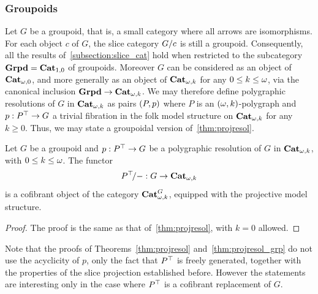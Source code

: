 \subsubsection{Groupoids}\label{ssubsec:resol_grp}
Let $G$ be a groupoid, that is, a small category where all arrows are
isomorphisms. For each
object $c$ of $G$, the slice category $G/c$ is still a groupoid. Consequently,
all the results of~\cref{subsection:slice_cat} hold when restricted to the
subcategory $\mathbf{Grpd}=\mathbf{Cat}_{1,0}$ of groupoids. Moreover $G$ can be
considered as an object of $\mathbf{Cat}_{\omega,0}$, and more generally as an object of $\mathbf{Cat}_{\omega,k}$ for any $0\leq k \leq \omega$, via the canonical inclusion $\mathbf{Grpd} \to \mathbf{Cat}_{\omega,k}$. We may therefore
define polygraphic resolutions of $G$ in $\mathbf{Cat}_{\omega,k}$ as pairs $(P,p)$ where $P$ is an $(\omega,k)$-polygraph and  $p:P^\top\to G$ a trivial fibration
in the folk model structure on $\mathbf{Cat}_{\omega,k}$ for any $k\geq 0$.  Thus, we may state a
groupoidal version of~\cref{thm:projresol}.
\begin{theorem}\label{thm:projresol_grp} Let $G$ be a groupoid and
$p:P^\top\to G$ be a polygraphic resolution of $G$ in $\mathbf{Cat}_{\omega,k}$, with
$0\leq k\leq \omega$. The functor
    \[P^\top\!/-:G\to \mathbf{Cat}_{\omega,k}\] is a cofibrant object of the
category $\mathbf{Cat}_{\omega,k}^{G}$, equipped with the projective model
structure.
\end{theorem}
\begin{proof} The proof is the same as that of~\cref{thm:projresol},
  with $k=0$ allowed.
\end{proof}
\begin{remark} Note that the proofs of Theorems~\ref{thm:projresol}
  and~\ref{thm:projresol_grp} do not use the acyclicity of $p$, only the
  fact that $P^\top$ is freely generated, together with the properties
  of the slice projection established before. However the statements are
  interesting only in the case where $P^\top$ is a cofibrant
  replacement of $G$.
\end{remark}
  
